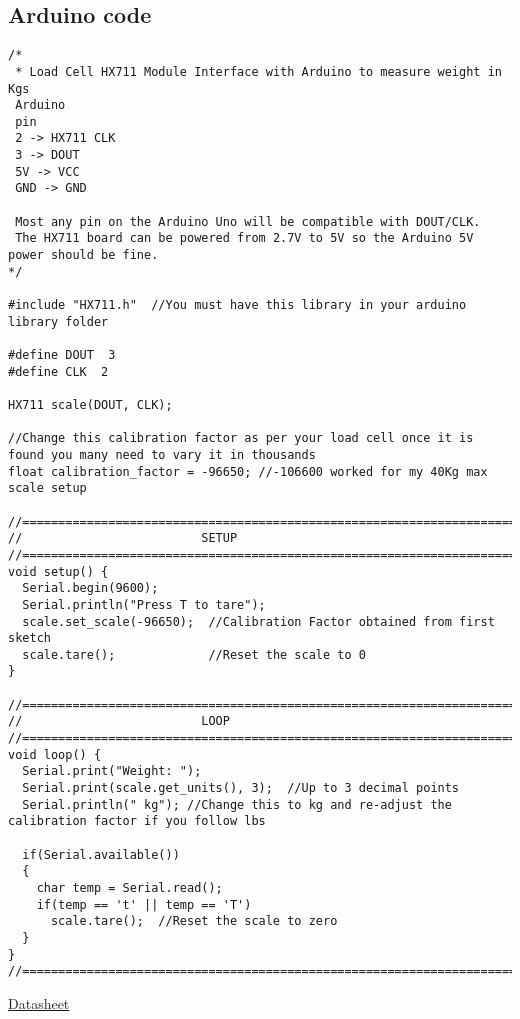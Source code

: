\documentclass[11pt]{article}
\begin{document}
\subsection{Arduino code}
\label{sec:org6cff042}
\begin{verbatim}
/*
 * Load Cell HX711 Module Interface with Arduino to measure weight in Kgs
 Arduino 
 pin 
 2 -> HX711 CLK
 3 -> DOUT
 5V -> VCC
 GND -> GND

 Most any pin on the Arduino Uno will be compatible with DOUT/CLK.
 The HX711 board can be powered from 2.7V to 5V so the Arduino 5V power should be fine.
*/

#include "HX711.h"  //You must have this library in your arduino library folder

#define DOUT  3
#define CLK  2

HX711 scale(DOUT, CLK);

//Change this calibration factor as per your load cell once it is found you many need to vary it in thousands
float calibration_factor = -96650; //-106600 worked for my 40Kg max scale setup 

//=============================================================================================
//                         SETUP
//=============================================================================================
void setup() {
  Serial.begin(9600);  
  Serial.println("Press T to tare");
  scale.set_scale(-96650);  //Calibration Factor obtained from first sketch
  scale.tare();             //Reset the scale to 0  
}

//=============================================================================================
//                         LOOP
//=============================================================================================
void loop() {
  Serial.print("Weight: ");
  Serial.print(scale.get_units(), 3);  //Up to 3 decimal points
  Serial.println(" kg"); //Change this to kg and re-adjust the calibration factor if you follow lbs

  if(Serial.available())
  {
    char temp = Serial.read();
    if(temp == 't' || temp == 'T')
      scale.tare();  //Reset the scale to zero      
  }
}
//=============================================================================================
\end{verbatim}
\href{https://circuits4you.com/wp-content/uploads/2016/11/hx711\_datasheet\_english.pdf}{Datasheet
}
\end{document}
